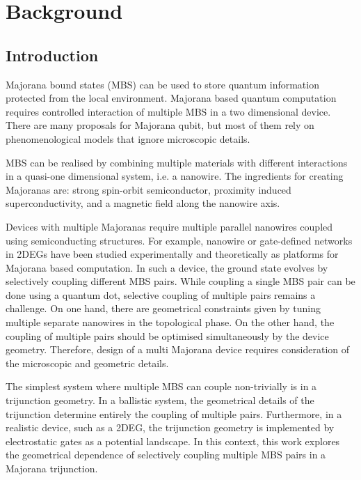 \chapter{Background}

\section{Introduction}

Majorana bound states (MBS) can be used to store quantum information protected from the local environment.
Majorana based quantum computation requires controlled interaction of multiple MBS in a two dimensional device.
There are many proposals for Majorana qubit, but most of them rely on phenomenological models that ignore microscopic details.

MBS can be realised by combining multiple materials with different interactions in a quasi-one dimensional system, i.e. a nanowire.
The ingredients for creating Majoranas are: strong spin-orbit semiconductor, proximity induced superconductivity, and a magnetic field along the nanowire axis.

Devices with multiple Majoranas require multiple parallel nanowires coupled using semiconducting structures.
For example, nanowire or gate-defined networks in 2DEGs have been studied experimentally and theoretically as platforms for Majorana based computation.
In such a device, the ground state evolves by selectively coupling different MBS pairs.
While coupling a single MBS pair can be done using a quantum dot, selective coupling of multiple pairs remains a challenge.
On one hand, there are geometrical constraints given by tuning multiple separate nanowires in the topological phase.
On the other hand, the coupling of multiple pairs should be optimised simultaneously by the device geometry.
Therefore, design of a multi Majorana device requires consideration of the microscopic and geometric details.
 
The simplest system where multiple MBS can couple non-trivially is in a trijunction geometry.
In a ballistic system, the geometrical details of the trijunction determine entirely the coupling of multiple pairs.
Furthermore, in a realistic device, such as a 2DEG, the trijunction geometry is implemented by electrostatic gates as a potential landscape.
In this context, this work explores the geometrical dependence of selectively coupling multiple MBS pairs in a Majorana trijunction.

